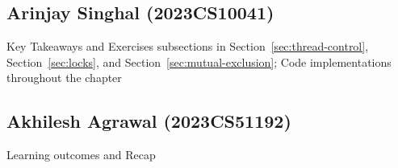 \subsection*{Arinjay Singhal (2023CS10041)}
Key Takeaways and Exercises subsections in Section~\ref{sec:thread-control}, Section~\ref{sec:locks}, and Section~\ref{sec:mutual-exclusion}; Code implementations throughout the chapter

\subsection*{Akhilesh Agrawal (2023CS51192)}
Learning outcomes and Recap 
